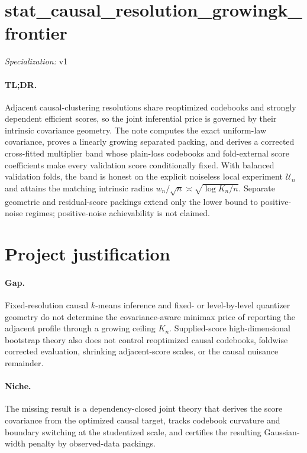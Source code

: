 \documentclass{article}
\begin{document}
\sloppy

\section*{stat\_\allowbreak{}causal\_\allowbreak{}resolution\_\allowbreak{}growingk\_\allowbreak{}frontier}

\noindent\textit{Specialization:} v1\par

\paragraph{TL;DR.} Adjacent causal-clustering resolutions share reoptimized codebooks and strongly dependent efficient scores, so the joint inferential price is governed by their intrinsic covariance geometry. The note computes the exact uniform-law covariance, proves a linearly growing separated packing, and derives a corrected cross-fitted multiplier band whose plain-loss codebooks and fold-external score coefficients make every validation score conditionally fixed. With balanced validation folds, the band is honest on the explicit noiseless local experiment \(\mathcal U_n\) and attains the matching intrinsic radius \(w_n/\sqrt n\asymp\sqrt{\log K_n/n}\). Separate geometric and residual-score packings extend only the lower bound to positive-noise regimes; positive-noise achievability is not claimed.

\section{Project justification}

\paragraph{Gap.} Fixed-resolution causal \(k\)-means inference and fixed- or level-by-level quantizer geometry do not determine the covariance-aware minimax price of reporting the adjacent profile through a growing ceiling \(K_n\). Supplied-score high-dimensional bootstrap theory also does not control reoptimized causal codebooks, foldwise corrected evaluation, shrinking adjacent-score scales, or the causal nuisance remainder.

\paragraph{Niche.} The missing result is a dependency-closed joint theory that derives the score covariance from the optimized causal target, tracks codebook curvature and boundary switching at the studentized scale, and certifies the resulting Gaussian-width penalty by observed-data packings.
\end{document}
